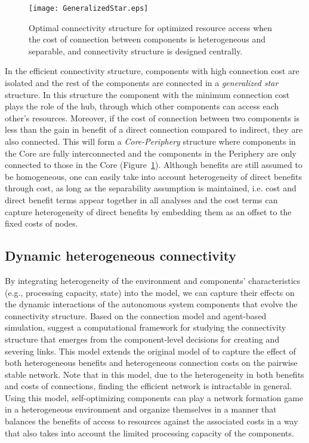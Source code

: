 \documentclass[journal,onecolumn]{IEEEtran}
\theoremstyle{plain}
\begin{document}
\begin{figure}[!t]
\centering
\texttt{[image: GeneralizedStar.eps]}
\caption{Optimal connectivity structure for optimized resource access when the cost of connection between components is heterogeneous and separable, and connectivity structure is designed centrally.}
\label{GeneralizedStar}
\end{figure}


In the efficient connectivity structure, components with high connection cost are isolated and the rest of the components are connected in a \textit{generalized star} structure. In this structure the component with the minimum connection cost plays the role of the hub, through which other components can access each other's resources. Moreover, if the cost of connection between two components is less than the gain in benefit of a direct connection compared to indirect, they are also connected. This will form a \textit{Core-Periphery} structure where components in the Core are fully interconnected and the components in the Periphery are only connected to those in the Core (Figure~\ref{GeneralizedStar}). Although benefits are still assumed to be homogeneous, one can easily take into account heterogeneity of direct benefits through cost, as long as the separability assumption is maintained, i.e. cost and direct benefit terms appear together in all analyses and the cost terms can capture heterogeneity of direct benefits by embedding them as an offset to the fixed costs of nodes.

\subsection{Dynamic heterogeneous connectivity}
\label{Dynamic_heterogeneous_connectivity}



By integrating heterogeneity of the environment and components' characteristics (e.g., processing capacity, state) into the model, we can capture their effects on the dynamic interactions of the autonomous system components that evolve the connectivity structure. Based on the connection model and agent-based simulation, \cite{heydari2015emergence} suggest a computational framework for studying the connectivity structure that emerges from the component-level decisions for creating and severing links. This model extends the original model of \cite{jackson1996strategic} to capture the effect of both heterogeneous benefits and heterogeneous connection costs on the pairwise stable network. Note that in this model, due to the heterogeneity in both benefits and costs of connections, finding the efficient network is intractable in general. Using this model, self-optimizing components can play a network formation game in a heterogeneous environment and organize themselves in a manner that balances the benefits of access to resources against the associated costs in a way that also takes into account the limited processing capacity of the components.
\end{document}

